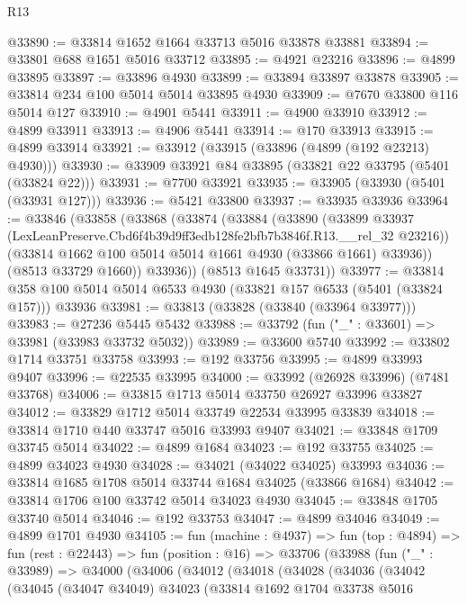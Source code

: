 \begin{lexlean}{R13}
\begin{coremodule}
@33890 := @33814 @1652 @1664 @33713 @5016 @33878 @33881
@33894 := @33801 @688 @1651 @5016 @33712
@33895 := @4921 @23216
@33896 := @4899 @33895
@33897 := @33896 @4930
@33899 := @33894 @33897 @33878
@33905 := @33814 @234 @100 @5014 @5014 @33895 @4930
@33909 := @7670 @33800 @116 @5014 @127
@33910 := @4901 @5441
@33911 := @4900 @33910
@33912 := @4899 @33911
@33913 := @4906 @5441
@33914 := @170 @33913
@33915 := @4899 @33914
@33921 := @33912 (@33915 (@33896 (@4899 (@192 @23213) @4930)))
@33930 := @33909 @33921 @84 @33895 (@33821 @22 @33795 (@5401 (@33824 @22)))
@33931 := @7700 @33921
@33935 := @33905 (@33930 (@5401 (@33931 @127)))
@33936 := @5421 @33800
@33937 := @33935 @33936
@33964 := @33846
    (@33858
      (@33868
        (@33874
          (@33884
            (@33890
              (@33899
                @33937
                (LexLeanPreserve.Cbd6f4b39d9ff3edb128fe2bfb7b3846f.R13.__rel_32 @23216))
              (@33814 @1662 @100 @5014 @5014 @1661 @4930 (@33866 @1661) @33936))
            (@8513 @33729 @1660))
          @33936))
      (@8513 @1645 @33731))
@33977 := @33814 @358 @100 @5014 @5014 @6533 @4930 (@33821 @157 @6533 (@5401 (@33824 @157))) @33936
@33981 := @33813 (@33828 (@33840 (@33964 @33977)))
@33983 := @27236 @5445 @5432
@33988 := @33792 (fun ("_" : @33601) => @33981 (@33983 @33732 @5032))
@33989 := @33600 @5740
@33992 := @33802 @1714 @33751 @33758
@33993 := @192 @33756
@33995 := @4899 @33993 @9407
@33996 := @22535 @33995
@34000 := @33992 (@26928 @33996) (@7481 @33768)
@34006 := @33815 @1713 @5014 @33750 @26927 @33996 @33827
@34012 := @33829 @1712 @5014 @33749 @22534 @33995 @33839
@34018 := @33814 @1710 @440 @33747 @5016 @33993 @9407
@34021 := @33848 @1709 @33745 @5014
@34022 := @4899 @1684
@34023 := @192 @33755
@34025 := @4899 @34023 @4930
@34028 := @34021 (@34022 @34025) @33993
@34036 := @33814 @1685 @1708 @5014 @33744 @1684 @34025 (@33866 @1684)
@34042 := @33814 @1706 @100 @33742 @5014 @34023 @4930
@34045 := @33848 @1705 @33740 @5014
@34046 := @192 @33753
@34047 := @4899 @34046
@34049 := @4899 @1701 @4930
@34105 := fun (machine : @4937) =>
  fun (top : @4894) =>
  fun (rest : @22443) =>
  fun (position : @16) =>
  @33706
    (@33988
      (fun ("_" : @33989) =>
      @34000
        (@34006
          (@34012
            (@34018
              (@34028
                (@34036
                  (@34042
                    (@34045
                      (@34047 @34049)
                      @34023
                      (@33814
                        @1692
                        @1704
                        @33738
                        @5016

\end{coremodule}
\end{lexlean}

